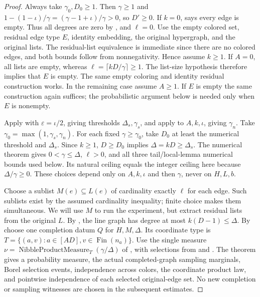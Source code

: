 \begin{proof}
Always take $\gamma_0,D_0\ge1$. Then $\gamma\ge1$ and
$1-(1-\iota)/\gamma=(\gamma-1+\iota)/\gamma>0$, so $D'\ge0$.
If $k=0$,  says every edge is empty.
Thus all degrees are zero by , and $\ell=0$.
Use the empty colored set, residual edge type $E$, identity embedding,
the original hypergraph, and the original lists. The residual-list
equivalence is immediate since there are no colored edges, and both bounds
follow from nonnegativity. Hence assume $k\ge1$.
If $A=0$, all lists are empty, whereas $\ell=\lceil kD/\gamma\rceil\ge1$.
The list-size hypothesis therefore implies that $E$ is empty. The same
empty coloring and identity residual construction works. In the remaining
case assume $A\ge1$. If $E$ is empty the same construction again suffices;
the probabilistic argument below is needed only when $E$ is nonempty.

Apply  with $\varepsilon=\iota/2$,
giving thresholds $\Delta_s,\gamma_s$, and apply
 to $A,k,\iota$, giving $\gamma_n$.
Take $\gamma_0=\max(1,\gamma_s,\gamma_n)$. For each fixed
$\gamma\ge\gamma_0$, take $D_0$ at least the numerical threshold and
$\Delta_s$. Since $k\ge1$, $D\ge D_0$ implies $\Delta=kD\ge\Delta_s$.
The numerical theorem gives $0<\gamma\le\Delta$, $\ell>0$, and all three
tail/local-lemma numerical bounds used below. Its natural ceiling equals
the integer ceiling here because $\Delta/\gamma\ge0$.
These choices depend only on $A,k,\iota$ and then $\gamma$, never on
$H,L,b$.

Choose a sublist $M(e)\subseteq L(e)$ of cardinality exactly $\ell$ for
each edge. Such sublists exist by the assumed cardinality inequality;
finite choice makes them simultaneous. We will use $M$ to run the
experiment, but extract residual lists from the original $L$.
By , the line graph has degree
at most $k(D-1)\le\Delta$. By 
choose one completion datum $Q$ for $H,M,\Delta$.
Its coordinate type is $T=\{(a,v):a\in[AD],v\in\operatorname{Fin}(n_a)\}$.
Use the single measure $\nu=\operatorname{NibbleProductMeasure}_T(\gamma/\Delta)$
of , with selections from
 and .
The theorem  gives a probability measure,
the actual completed-graph sampling marginals, Borel selection events,
independence across colors, the coordinate product law, and pointwise
independence of each selected original-edge set. No new completion or
sampling witnesses are chosen in the subsequent estimates.


\end{proof}
